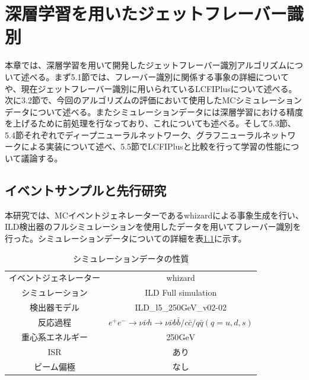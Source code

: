 


\chapter{深層学習を用いたジェットフレーバー識別} \label{sec:Flavortagging}
本章では、深層学習を用いて開発したジェットフレーバー識別アルゴリズムについて述べる。まず5.1節では、フレーバー識別に関係する事象の詳細についてや、現在ジェットフレーバー識別に用いられているLCFIPlusについて述べる。次に3.2節で、今回のアルゴリズムの評価において使用したMCシミュレーションデータについて述べる。またシミュレーションデータには深層学習における精度を上げるために前処理を行なっており、これについても述べる。そして5.3節、5.4節それぞれでディープニューラルネットワーク、グラフニューラルネットワークによる実装について述べ、5.5節でLCFIPlusと比較を行って学習の性能について議論する。
\section{イベントサンプルと先行研究}
本研究では、MCイベントジェネレーターであるwhizardによる事象生成を行い、ILD検出器のフルシミュレーションを使用したデータを用いてフレーバー識別を行った。シミュレーションデータについての詳細を表\ref{inputdatas}に示す。
\begin{table}[H]
 \centering
 \begin{tabular}{ c c }
 \hline
 イベントジェネレーター & whizard\\
 シミュレーション & ILD Full simulation\\
 検出器モデル & ILD\_l5\_250GeV\_v02-02\\
 反応過程 & $e^+e^- \rightarrow \nu \bar{\nu} h \rightarrow \nu \bar{\nu} b \bar{b} / c \bar{c} / q \bar{q} (q = u,d,s)$\\
 重心系エネルギー & 250$\mathrm{GeV}$ \\
 ISR & あり\\
 ビーム偏極 & なし\\
 \hline
  \end{tabular}
  \label{inputdatas}
  \caption{シミュレーションデータの性質}
\end{table}
